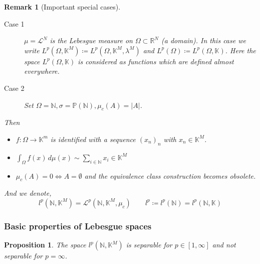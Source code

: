 \documentclass[a4paper]{article}
\newcounter{lecref}[section]
\numberwithin{lecref}{section}
\newtheorem*{Remark}{Remark}
\newtheorem{proposition}[lecref]{Proposition}
\newcommand{\Abs}[1]{\left|#1\right|}
\begin{document}
\begin{Remark}[Important special cases]
	\begin{description}
		\item[Case 1]
			$\mu = \mathcal L^N$ is the Lebesgue measure on $\Omega \subset \mathbb R^N$ (a domain).
			In this case we write $L^p(\Omega, \mathbb K^M) \coloneqq L^p(\Omega, \mathbb K^M, \lambda^M)$ and $L^p(\Omega) \coloneqq L^p(\Omega, \mathbb K)$.
			Here the space $L^p(\Omega, \mathbb K)$ is considered as functions which are defined almost everywhere.
		\item[Case 2]
			Set $\Omega = \mathbb N, \sigma = \mathbb P(\mathbb N), \mu_c(A) = \Abs{A}$.
	\end{description}
	Then
	\begin{itemize}
		\item $f: \Omega \to \mathbb K^m$ is identified with a sequence $(x_n)_n$ with $x_n \in \mathbb K^M$.
		\item $\int_{\Omega} f(x) \, d\mu(x) \sim \sum_{i \in \mathbb N} x_i \in \mathbb K^M$
		\item $\mu_c(A) = 0 \iff A = \emptyset$ and the equivalence class construction becomes obsolete.
	\end{itemize}
	And we denote,
	\[ l^p(\mathbb N, \mathbb K^M) = \mathcal L^p(\mathbb N, \mathbb K^M, \mu_c) \qquad l^p \coloneqq l^p(\mathbb N) = l^p(\mathbb N, \mathbb K) \]
\end{Remark}

\subsubsection{Basic properties of Lebesgue spaces}

\begin{proposition}
	\label{proposition:2.16}
	The space $l^p(\mathbb N, \mathbb K^M)$ is separable for $p \in [1, \infty]$ and \emph{not} separable for $p = \infty$.
\end{proposition}
\end{document}
